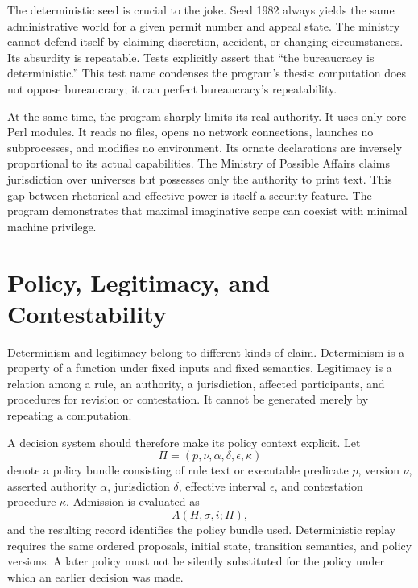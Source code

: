 \documentclass[11pt]{article}
\begin{document}
The deterministic seed is crucial to the joke. Seed 1982 always yields the same administrative world for a given permit number and appeal state. The ministry cannot defend itself by claiming discretion, accident, or changing circumstances. Its absurdity is repeatable. Tests explicitly assert that ``the bureaucracy is deterministic.'' This test name condenses the program's thesis: computation does not oppose bureaucracy; it can perfect bureaucracy's repeatability.

At the same time, the program sharply limits its real authority. It uses only core Perl modules. It reads no files, opens no network connections, launches no subprocesses, and modifies no environment. Its ornate declarations are inversely proportional to its actual capabilities. The Ministry of Possible Affairs claims jurisdiction over universes but possesses only the authority to print text. This gap between rhetorical and effective power is itself a security feature. The program demonstrates that maximal imaginative scope can coexist with minimal machine privilege.

\section{Policy, Legitimacy, and Contestability}

Determinism and legitimacy belong to different kinds of claim. Determinism is a property of a function under fixed inputs and fixed semantics. Legitimacy is a relation among a rule, an authority, a jurisdiction, affected participants, and procedures for revision or contestation. It cannot be generated merely by repeating a computation.

A decision system should therefore make its policy context explicit. Let
\begin{equation}
  \Pi=(p,\nu,\alpha,\delta,\epsilon,\kappa)
  \label{eq:policy-bundle}
\end{equation}
denote a policy bundle consisting of rule text or executable predicate $p$, version $\nu$, asserted authority $\alpha$, jurisdiction $\delta$, effective interval $\epsilon$, and contestation procedure $\kappa$. Admission is evaluated as
\begin{equation}
  A(H,\sigma,i;\Pi),
  \label{eq:policy-relative-admission}
\end{equation}
and the resulting record identifies the policy bundle used. Deterministic replay requires the same ordered proposals, initial state, transition semantics, and policy versions. A later policy must not be silently substituted for the policy under which an earlier decision was made.
\end{document}
